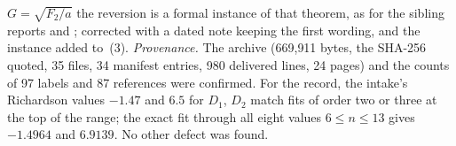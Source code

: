 \begin{writenote}
$G=\sqrt{F_2/a}$ the reversion is a formal instance of that theorem, as for
the sibling reports  and
; corrected with a dated note keeping the
first wording, and the instance added to~(3). \emph{Provenance.} The archive
(669{,}911 bytes, the SHA-256 quoted, 35 files, 34 manifest entries, 980
delivered lines, 24 pages) and the counts of 97 labels and 87 references
were confirmed. For the record, the intake's Richardson values $-1.47$ and
$6.5$ for $D_1$, $D_2$ match fits of order two or three at the top of the
range; the exact fit through all eight values $6\le n\le13$ gives
$-1.4964$ and $6.9139$. No other defect was found.
\end{writenote}
